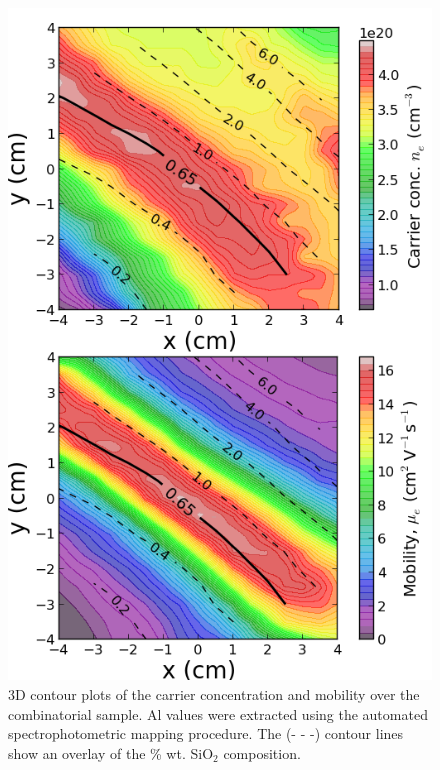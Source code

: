 \documentclass[final,5p,times]{elsarticle}
\begin{document}
\begin{figure}[ht!]
\centering
\includegraphics[width = 1\columnwidth]{figure2.png}
\caption{\label{fig:5} 3D contour plots of the carrier concentration and mobility over the combinatorial sample. Al values were extracted using the automated spectrophotometric mapping procedure. The (- - -) contour lines show an overlay of the \% wt. SiO$_{2}$ composition.}
\end{figure}
\end{document}
